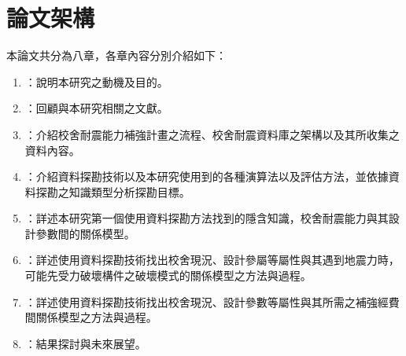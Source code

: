 \section{論文架構}

本論文共分為八章，各章內容分別介紹如下：

\begin{enumerate}
\item \textbf{}：說明本研究之動機及目的。
\item \textbf{}：回顧與本研究相關之文獻。
\item \textbf{}：介紹校舍耐震能力補強計畫之流程、校舍耐震資料庫之架構以及其所收集之資料內容。
\item \textbf{}：介紹資料探勘技術以及本研究使用到的各種演算法以及評估方法，並依據資料探勘之知識類型分析探勘目標。
\item \textbf{}：詳述本研究第一個使用資料探勘方法找到的隱含知識，校舍耐震能力與其設計參數間的關係模型。
\item \textbf{}：詳述使用資料探勘技術找出校舍現況、設計參屬等屬性與其遇到地震力時，可能先受力破壞構件之破壞模式的關係模型之方法與過程。
\item \textbf{}：詳述使用資料探勘技術找出校舍現況、設計參數等屬性與其所需之補強經費間關係模型之方法與過程。
\item \textbf{}：結果探討與未來展望。
\end{enumerate}



